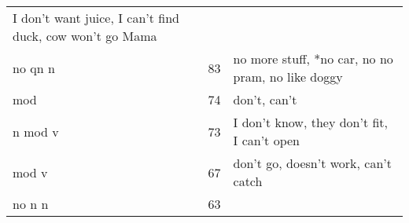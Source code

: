 \documentclass[man]{apa6}
\begin{document}
\begin{longtable}[]{@{}lll@{}}
\begin{minipage}[t]{0.47\columnwidth}
I don't want juice, I can't find duck, cow won't go Mama\strut
\end{minipage}\tabularnewline
\begin{minipage}[t]{0.23\columnwidth}\raggedright\strut
no qn n\strut
\end{minipage} & \begin{minipage}[t]{0.15\columnwidth}\raggedright\strut
83\strut
\end{minipage} & \begin{minipage}[t]{0.47\columnwidth}\raggedright\strut
no more stuff, *no car, no no pram, no like doggy\strut
\end{minipage}\tabularnewline
\begin{minipage}[t]{0.23\columnwidth}\raggedright\strut
mod\strut
\end{minipage} & \begin{minipage}[t]{0.15\columnwidth}\raggedright\strut
74\strut
\end{minipage} & \begin{minipage}[t]{0.47\columnwidth}\raggedright\strut
don't, can't\strut
\end{minipage}\tabularnewline
\begin{minipage}[t]{0.23\columnwidth}\raggedright\strut
n mod v\strut
\end{minipage} & \begin{minipage}[t]{0.15\columnwidth}\raggedright\strut
73\strut
\end{minipage} & \begin{minipage}[t]{0.47\columnwidth}\raggedright\strut
I don't know, they don't fit, I can't open\strut
\end{minipage}\tabularnewline
\begin{minipage}[t]{0.23\columnwidth}\raggedright\strut
mod v\strut
\end{minipage} & \begin{minipage}[t]{0.15\columnwidth}\raggedright\strut
67\strut
\end{minipage} & \begin{minipage}[t]{0.47\columnwidth}\raggedright\strut
don't go, doesn't work, can't catch\strut
\end{minipage}\tabularnewline
\begin{minipage}[t]{0.23\columnwidth}\raggedright\strut
no n n\strut
\end{minipage} & \begin{minipage}[t]{0.15\columnwidth}\raggedright\strut
63\strut
\end{minipage} & \begin{minipage}[t]{0.47\columnwidth}\raggedright\strut

\end{minipage}
\end{longtable}
\end{document}

